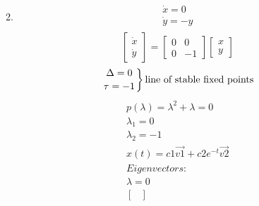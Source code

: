 \documentclass[a4paper,10pt]{article}
\begin{document}
\begin{enumerate}
\begin{enumerate}
\begin{equation}
\begin{aligned}
                    \end{aligned}
                \end{equation}
            \item
                \begin{equation}
                    \begin{aligned}
                        \dot{x}= 0\\
                        \dot{y}= -y\\
                    \end{aligned}
                \end{equation}
                \begin{equation}
                    \begin{bmatrix}
                        \dot{x}\\
                        \dot{y}
                    \end{bmatrix}
                    =
                    \begin{bmatrix}
                        0 & 0\\
                        0 & -1
                    \end{bmatrix}
                    \begin{bmatrix}
                        x\\
                        y
                    \end{bmatrix}
                \end{equation}
                \begin{equation}
                    \left.
                    \Delta = 0 \atop
                    \tau=-1 
                    \right\}{\text{line of stable fixed points}}
                \end{equation}
                \begin{equation}
                    \begin{aligned}
                        p(\lambda)= \lambda^{2} + \lambda=0\\
                        \lambda_{1}= 0\\
                        \lambda_{2}= -1\\
                        x(t)= c1\vec{v1} + c2e^{-t}\vec{v2}\\
                        Eigenvectors:\\
                        \lambda=0\\
                        \begin{bmatrix}

\end{bmatrix}
\end{aligned}
\end{equation}
\end{enumerate}
\end{enumerate}
\end{document}
